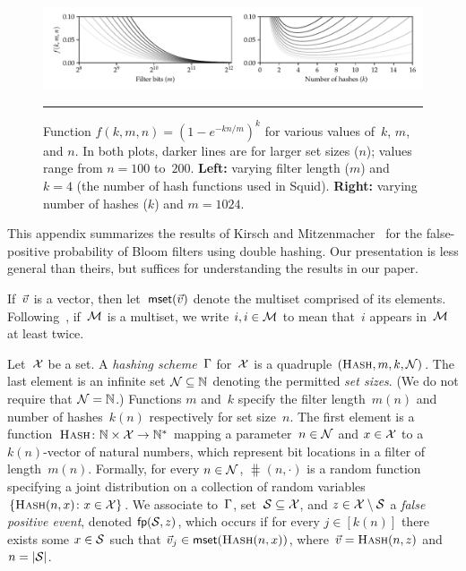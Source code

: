 %
\label{sec:mitz}
\newcommand{\hashfam}{\setfont{H}}
\newcommand{\sizes}{\setfont{N}}
\newcommand{\length}{m}
\newcommand{\hashes}{k}
\newcommand{\FP}{\procfont{fp}}
\def\vin(#1,#2){#1 sub}

\begin{figure}[t]
  \centering
  \hspace*{-8pt}
  \includegraphics[page=1,scale=0.625]{fig/bf-viz}
  \vspace{-24pt}
  \caption{
    Function $f(k,m,n) = (1-e^{-kn/m})^k$ for various values of~$k$,
    $m$, and $n$.
    In both plots, darker lines are for larger set sizes ($n$); values
    range from $n=100$ to~$200$.
    \textbf{Left:} varying filter length ($m$) and $k=4$ (the number
    of hash functions used in Squid).
    \textbf{Right:} varying number of hashes ($k$) and $m=1024$.
  }
  \vspace{6pt}
  \hrule
  \label{fig:bf-viz}
\end{figure}

This appendix summarizes the results of Kirsch and
Mitzenmacher~\cite{kirsch2006less} for the false-positive probability of Bloom
filters using double hashing.
%
Our presentation is less general than theirs, but suffices for understanding the
results in our paper.

\newcommand{\mset}{\procfont{mset}}
\newcommand{\hashscheme}{\capgreekfont{\Gamma}}
%
If~$\vec{v}$ is a vector, then let~$\mset(\vv)$ denote the multiset comprised of its
elements.
%
Following~\cite{kirsch2006less}, if~$\mathcal{M}$ is a multiset, we write $i,i
\in \mathcal{M}$ to mean that~$i$ appears in~$\mathcal{M}$ at least twice.

%
Let~$\mathcal{X}$ be a set. A \emph{hashing scheme}~$\hashscheme$ for~$\mathcal{X}$ is a
quadruple $(\hash, \length, \hashes, \sizes)$.
%
The last element is an infinite set $\sizes \subseteq \N$ denoting the permitted
\emph{set sizes}. (We do not require that $\sizes = \N$.)
%
Functions $\length$ and~$\hashes$ specify the filter length~$\length(n)$ and
number of hashes~$\hashes(n)$ respectively for set size~$n$.
The first element is a function~$\textsc{Hash}\colon\mathbb{N}\times\mathcal{X}\to\mathbb{N}^*$ mapping a
parameter~$n\in\sizes$ and $x\in\mathcal{X}$ to a $\hashes(n)$-vector of natural
numbers, which represent bit locations in a filter of length~$\length(n)$.
%
Formally, for every $n \in \sizes$, $\hash(n,\cdot)$ is a random function
specifying a joint distribution on a collection of random variables $\{
\textsc{Hash}(n,x)\colon x\in\mathcal{X}\}$.
%
We associate to~$\hashscheme$, set~$\mathcal{S}\subseteq\mathcal{X}$, and
$z\in\mathcal{X}\setminus\mathcal{S}$ a \emph{false positive event}, denoted
$\FP(\col,z)$, which occurs if for every $j \in [\hashes(n)]$ there
exists some $x\in\mathcal{S}$ such that $\vv_j \in \mset(\hash(n,x))$, where $\vec{v} =
\textsc{Hash}(n,z)$ and $n = |\mathcal{S}|$.


